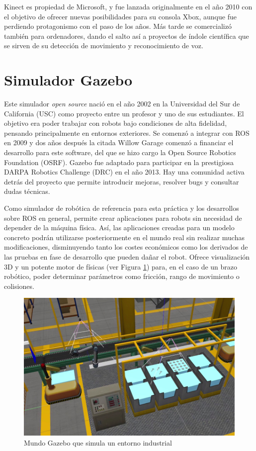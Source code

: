 \documentclass[12pt,spanish,chapterprefix, numbers=noenddot]{book}
\numberwithin{equation}{section}
\numberwithin{figure}{section}
\begin{document}
Kinect es propiedad de Microsoft, y fue lanzada originalmente en el año 2010 con el objetivo de ofrecer nuevas posibilidades para su consola Xbox, aunque fue perdiendo protagonismo con el paso de los años. Más tarde se comercializó también para ordenadores, dando el salto así a proyectos de índole científica que se sirven de su detección de movimiento y reconocimiento de voz. 

\section{Simulador Gazebo}
Este simulador \textit{open source} nació en el año 2002 en la Universidad del Sur de California (USC) como proyecto entre un profesor y uno de sus estudiantes. El objetivo era poder trabajar con robots bajo condiciones de alta fidelidad, pensando principalmente en entornos exteriores. Se comenzó a integrar con ROS en 2009 y dos años después la citada Willow Garage comenzó a financiar el desarrollo para este software, del que se hizo cargo la Open Source Robotics Foundation (OSRF).
Gazebo \cite{gazebo} fue adaptado para participar en la prestigiosa DARPA Robotics Challenge (DRC) en el año 2013. Hay una comunidad activa detrás del proyecto que permite introducir mejoras, resolver bugs y consultar dudas técnicas.

Como simulador de robótica de referencia para esta práctica y los desarrollos sobre ROS en general, permite crear aplicaciones para robots sin necesidad de depender de la máquina física. Así, las aplicaciones creadas para un modelo concreto podrán utilizarse posteriormente en el mundo real sin  realizar muchas modificaciones, disminuyendo tanto los costes económicos como los derivados de las pruebas en fase de desarrollo que pueden dañar el robot. 
Ofrece visualización 3D y un potente motor de físicas (ver Figura \ref{fig:gazeboExample}) para, en el caso de un brazo robótico, poder determinar parámetros como fricción, rango de movimiento o colisiones.

\begin{figure}[hbt!]
\centering
\includegraphics[width=12cm]{Figs/gazebo_example.jpg}
\par
\caption{\label{fig:gazeboExample}Mundo Gazebo que simula un entorno industrial}
\end{figure}
\end{document}
